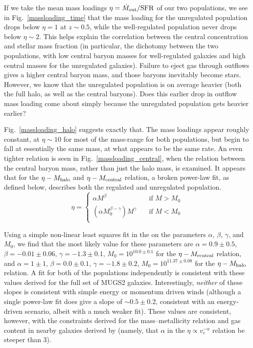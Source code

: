 If we take the mean mass loadings $\eta = \dot M_{\rm out}/\rm{SFR}$ of our two
populations, we see in Fig.~\ref{massloading_time} that the mass loading for
the unregulated population drops below $\eta=1$ at $z\sim0.5$, while the
well-regulated population never drops below $\eta\sim2$.  This helps explain the
correlation between the central concentration and stellar mass fraction (in
particular, the dichotomy between the two populations, with low central baryon
masses for well-regulated galaxies and high central masses for the unregulated
galaxies).  Failure to eject gas through outflows gives a higher central baryon
mass, and those baryons inevitably become stars.  However, we know that the
unregulated population is on average heavier (both the full halo, as well as the
central baryons).  Does this earlier drop in outflow mass loading come about
simply because the unregulated population gets heavier earlier?

Fig.~\ref{massloading_halo} suggests exactly that.  The mass loadings appear
roughly constant, at $\eta\sim10$ for most of the mass-range for both
populations, but begin to fall at essentially the same mass, at what appears to
be the same rate.  An even tighter relation is seen in
Fig.~\ref{massloading_central}, when the relation between the central baryon
mass, rather than just the halo mass, is examined. It appears that for the
$\eta-M_{\rm halo}$ and $\eta-M_{\rm central}$ relation, a broken power-law fit, as
defined below, describes both the regulated and unregulated population.
\begin{equation}
    \eta = 
    \begin{cases}
        \alpha M^\beta  & \quad \text{if } M > M_0 \\
        (\alpha M_0^{\beta-\gamma}) M^\gamma & \quad \text{if } M < M_0 \\
    \end{cases}
    \label{outflow_scaling}
\end{equation}

Using a simple non-linear least squares fit in the on the parameters $\alpha$,
$\beta$, $\gamma$, and $M_0$, we find that the most likely value for these
parameters are $\alpha=0.9\pm0.5$, $\beta=-0.01\pm0.06$, $\gamma=-1.3\pm0.1$,
$M_{0}=10^{10.0\pm0.1}$ for the $\eta-M_{\rm central}$ relation, and $\alpha=1\pm1$,
$\beta=0.0\pm0.1$, $\gamma=-1.8\pm0.2$, $M_{0}=10^{11.37\pm0.08}$ for the
$\eta-M_{\rm halo}$ relation.  A fit for both of the populations independently is
consistent with these values derived for the full set of MUGS2 galaxies.
Interestingly, {\it neither} of these slopes is consistent with simple energy
or momentum driven winds (although a single power-law fit does give a slope of
$\sim0.5\pm0.2$, consistent with an energy-driven scenario, albeit with a much
weaker fit).  These values are consistent, however, with the constraints derived
for the mass--metallicity relation and gas content in nearby galaxies derived by
\citet{Peeples2011} (namely, that $\alpha$ in the $\eta\propto v_c^{-\alpha}$
relation be steeper than 3).

